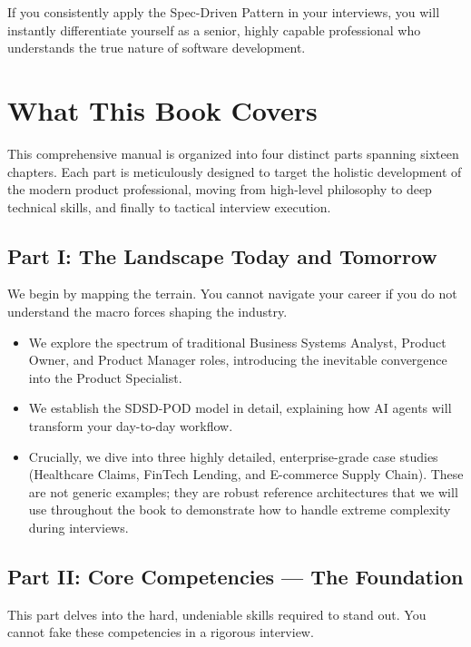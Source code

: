 \documentclass[
  11pt,
  openany,
  oneside]{book}
\providecommand{\tightlist}{%
  \setlength{\itemsep}{0pt}\setlength{\parskip}{0pt}}
\begin{document}
If you consistently apply the Spec-Driven Pattern in your interviews,
you will instantly differentiate yourself as a senior, highly capable
professional who understands the true nature of software development.

\section{What This Book Covers}\label{what-this-book-covers}

This comprehensive manual is organized into four distinct parts spanning
sixteen chapters. Each part is meticulously designed to target the
holistic development of the modern product professional, moving from
high-level philosophy to deep technical skills, and finally to tactical
interview execution.

\subsection{Part I: The Landscape Today and
Tomorrow}\label{part-i-the-landscape-today-and-tomorrow}

We begin by mapping the terrain. You cannot navigate your career if you
do not understand the macro forces shaping the industry.

\begin{itemize}
\tightlist
\item
  We explore the spectrum of traditional Business Systems Analyst,
  Product Owner, and Product Manager roles, introducing the inevitable
  convergence into the Product Specialist.
\item
  We establish the SDSD-POD model in detail, explaining how AI agents
  will transform your day-to-day workflow.
\item
  Crucially, we dive into three highly detailed, enterprise-grade case
  studies (Healthcare Claims, FinTech Lending, and E-commerce Supply
  Chain). These are not generic examples; they are robust reference
  architectures that we will use throughout the book to demonstrate how
  to handle extreme complexity during interviews.
\end{itemize}

\subsection{Part II: Core Competencies --- The
Foundation}\label{part-ii-core-competencies-the-foundation}

This part delves into the hard, undeniable skills required to stand out.
You cannot fake these competencies in a rigorous interview.
\end{document}
